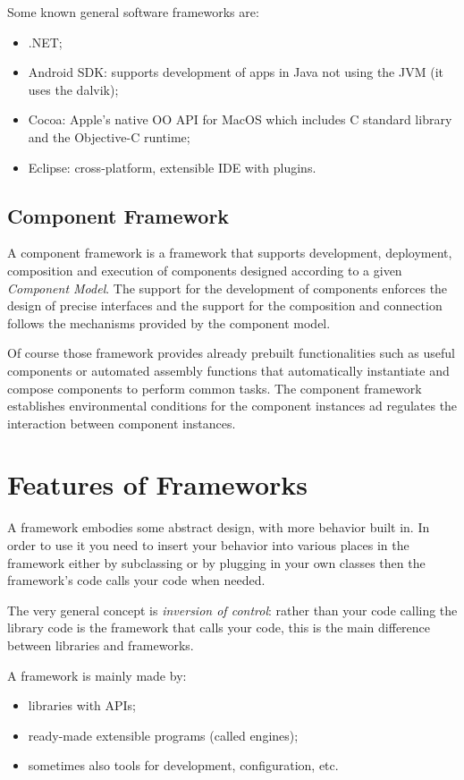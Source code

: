 Some known general software frameworks are:
\begin{itemize}
    \item .NET;
    \item Android SDK: supports development of apps in Java not using the JVM (it uses the dalvik);
    \item Cocoa: Apple's native OO API for MacOS which includes C standard library and the Objective-C runtime;
    \item Eclipse: cross-platform, extensible IDE with plugins.
\end{itemize}

\subsection{Component Framework}
A component framework is a framework that supports development, deployment, composition and execution of components designed according to a given \emph{Component Model}.
The support for the development of components enforces the design of precise interfaces and the support for the composition and connection follows the mechanisms provided by the component model.

Of course those framework provides already prebuilt functionalities such as useful components or automated assembly functions that automatically instantiate and compose components to perform common tasks.
The component framework establishes environmental conditions for the component instances ad regulates the interaction between component instances.

\section{Features of Frameworks}
A framework embodies some abstract design, with more behavior built in.
In order to use it you need to insert your behavior into various places in the framework either by subclassing or by plugging in your own classes then the framework's code calls your code when needed.

The very general concept is \emph{inversion of control}: rather than your code calling the library code is the framework that calls your code, this is the main difference between libraries and frameworks.

A framework is mainly made by:
\begin{itemize}
    \item libraries with APIs;
    \item ready-made extensible programs (called engines);
    \item sometimes also tools for development, configuration, etc.
\end{itemize}

